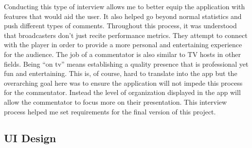 \documentclass[10pt,twocolumn]{article}
\begin{document}
Conducting this type of interview allows me to better equip the application with features that would aid the user. It also helped go beyond normal statistics and push different types of comments. Throughout this process, it was understood that broadcasters don't just recite performance metrics. They attempt to connect with the player in order to provide a more personal and entertaining experience for the audience. The job of a commentator is also similar to TV hosts in other fields. Being “on tv” means establishing a quality presence that is professional yet fun and entertaining. This is, of course, hard to translate into the app but the overarching goal here was to ensure the application will not impede this process for the commentator. Instead the level of organization displayed in the app will allow the commentator to focus more on their presentation. \break
\indent This interview process helped me set requirements for the final version of this project. 

\subsection{UI Design}
\end{document}
